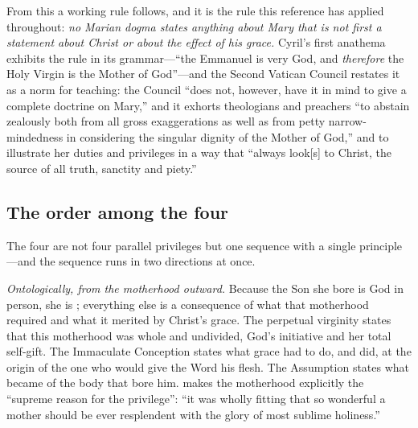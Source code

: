 From this a working rule follows, and it is the rule this reference has
applied throughout: \emph{no Marian dogma states anything about Mary that
is not first a statement about Christ or about the effect of his grace.}
Cyril's first anathema exhibits the rule in its grammar---``the Emmanuel
is very God, and \emph{therefore} the Holy Virgin is the Mother of
God''---and the Second Vatican Council restates it as a norm for
teaching: the Council ``does not, however, have it in mind to give a
complete doctrine on Mary,'' and it exhorts theologians and preachers
``to abstain zealously both from all gross exaggerations as well as from
petty narrow-mindedness in considering the singular dignity of the Mother
of God,'' and to illustrate her duties and privileges in a way that
``always look[s] to Christ, the source of all truth, sanctity and
piety.''

\subsection*{The order among the four}

The four are not four parallel privileges but one sequence with a single
principle---and the sequence runs in two directions at once.

\emph{Ontologically, from the motherhood outward.} Because the Son she
bore is God in person, she is ; everything else is a
consequence of what that motherhood required and what it merited by
Christ's grace. The perpetual virginity states that this motherhood was
whole and undivided, God's initiative and her total self-gift. The
Immaculate Conception states what grace had to do, and did, at the origin
of the one who would give the Word his flesh. The Assumption states what
became of the body that bore him.  makes the
motherhood explicitly the ``supreme reason for the privilege'': ``it was
wholly fitting that so wonderful a mother should be ever resplendent with
the glory of most sublime holiness.''

